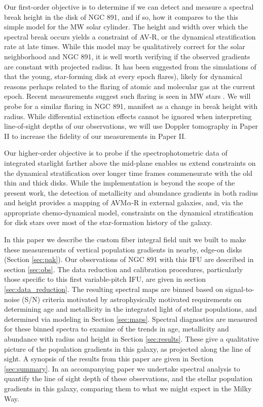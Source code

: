 Our first-order objective is to determine if we can detect and measure
a spectral break height in the disk of NGC 891, and if so, how it
compares to the this simple model for the MW solar cylinder. The
height and width over which the spectral break occurs yields a
constraint of AV-R, or the dynamical stratification rate at late
times. While this model may be qualitatively correct for the solar
neighborhood and NGC 891, it is well worth verifying if the observed
gradients are constant with projected radius.  It has been suggested
from the simulations of \citet{Martig14a} that the young, star-forming
disk at every epoch flares), likely for dynamical reasons perhaps
related to the flaring of atomic and molecular gas at the current
epoch. Recent measurements suggest such flaring is seen in MW stars
\citep{Ness16}. We will probe for a similar flaring in NGC 891,
manifest as a change in break height with radius.  While differential
extinction effects cannot be ignored when interpreting line-of-sight
depths of our observations, we will use Doppler tomography in Paper II
\citep[see for example,][]{Kregel05} to increase the fidelity of
our measurements in Paper II.

Our higher-order objective is to probe if the spectrophotometric data
of integrated starlight farther above the mid-plane enables us extend
constraints on the dynamical stratification over longer time frames
commensurate with the old thin and thick disks.  While the
implementation is beyond the scope of the present work, the detection
of metallicity and abundance gradients in both radius and height
provides a mapping of AVM$\alpha$-R in external galaxies, and, via the
appropriate chemo-dynamical model, constraints on the dynamical
stratification for disk stars over most of the star-formation history
of the galaxy.

In this paper we describe the custom fiber integral field unit we
built to make these measurements of vertical population gradients in
nearby, edge-on disks (Section \ref{sec:pak}).  Our observations of
NGC 891 with this IFU are described in section \ref{sec:obs}.  The
data reduction and calibration procedures, particularly those specific
to this first variable-pitch IFU, are given in section
\ref{sec:data_reduction}. The resulting spectral maps are binned based
on signal-to-noise (S/N) criteria motivated by astrophysically
motivated requirements on determining age and metallicity in the
integrated light of stellar populations, and determined via modeling
in Section \ref{sec:maps}. Spectral diagnostics are measured for these
binned spectra to examine of the trends in age, metallicity and
abundance with radius and height in Section \ref{sec:results}.  These
give a qualitative picture of the population gradients in this galaxy,
as projected along the line of sight. A synopsis of the results from
this paper are given in Section \ref{sec:summary}.  In an accompanying
paper we undertake spectral analysis to quantify the line of sight
depth of these observations, and the stellar population gradients in
this galaxy, comparing them to what we might expect in the Milky Way.

